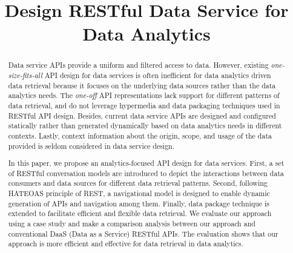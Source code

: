 \documentclass[10pt, conference, compsocconf]{IEEEtran}
\begin{document}
%
\title{Design RESTful Data Service for Data Analytics}


\author{
	}

\maketitle


\begin{abstract}
	
	
Data service APIs provide a uniform and filtered access to data. However, existing \textit{one-size-fits-all} API design for data services is often inefficient for data analytics driven data retrieval because it focuses on the underlying data sources rather than the data analytics needs. The \textit{one-off} API representations lack support for different patterns of data retrieval, and do not leverage hypermedia and data packaging techniques used in RESTful API design. Besides, current data service APIs are designed and configured statically rather than generated dynamically based on data analytics needs in different contexts. Lastly, context information about the origin, scope, and usage of the data provided is seldom considered in data service design.


In this paper, we propose an analytics-focused API design for data services. First, a set of RESTful conversation models are introduced to depict the interactions between data consumers and data sources for different data retrieval patterns. Second, following HATEOAS principle of REST, a navigational model is designed to enable dynamic generation of APIs and navigation among them.  Finally, data package technique is extended to facilitate efficient and flexible data retrieval. We evaluate our approach using a case study and make a comparison analysis between our approach and conventional DaaS (Data as a Service) RESTful APIs. The evaluation shows that our approach is more efficient and effective for data retrieval in data analytics.

\end{abstract}
\end{document}
